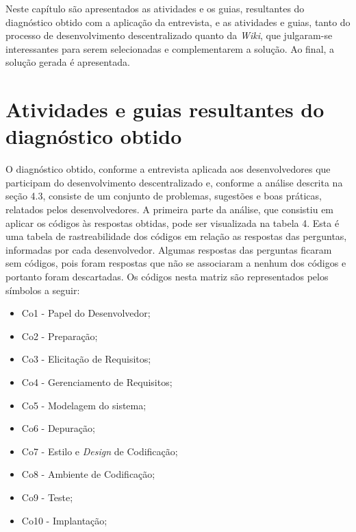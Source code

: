 Neste capítulo são apresentados as atividades e os guias, resultantes do diagnóstico obtido com a aplicação da entrevista, e as atividades e guias, tanto do processo de desenvolvimento descentralizado quanto
da \textit{Wiki}, que julgaram-se interessantes para serem selecionadas e complementarem a solução. Ao final, a solução gerada é apresentada.

\section{Atividades e guias resultantes do diagnóstico obtido}

O diagnóstico obtido, conforme a entrevista aplicada aos desenvolvedores que participam do desenvolvimento descentralizado e, conforme a análise descrita na seção 4.3, consiste de um conjunto de problemas, sugestões e boas práticas, relatados pelos desenvolvedores. A primeira parte da análise, que consistiu em aplicar os códigos às respostas obtidas, pode ser visualizada na tabela 4. Esta é uma tabela de rastreabilidade dos códigos em relação as respostas das perguntas, informadas por cada desenvolvedor. Algumas respostas das perguntas ficaram sem códigos, pois foram respostas que não se associaram a nenhum dos códigos e portanto foram descartadas. Os códigos nesta matriz são representados pelos símbolos a seguir:

\begin{itemize}
\item Co1 - Papel do Desenvolvedor;
\item Co2 - Preparação;
\item Co3 - Elicitação de Requisitos;
\item Co4 - Gerenciamento de Requisitos;
\item Co5 - Modelagem do sistema;
\item Co6 - Depuração;
\item Co7 - Estilo e \textit{Design} de Codificação;
\item Co8 - Ambiente de Codificação;
\item Co9 - Teste;
\item Co10 - Implantação;
\end{itemize}
\clearpage

